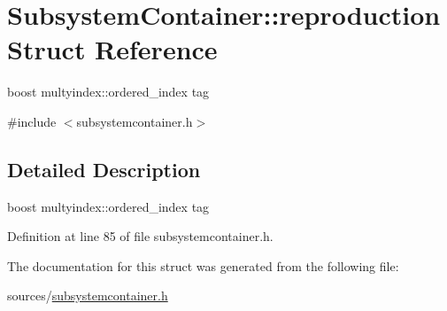 \hypertarget{structSubsystemContainer_1_1reproduction}{
\section{SubsystemContainer::reproduction Struct Reference}
\label{structSubsystemContainer_1_1reproduction}
}


boost multyindex::ordered\_\-index tag  




{\ttfamily \#include $<$subsystemcontainer.h$>$}



\subsection{Detailed Description}
boost multyindex::ordered\_\-index tag 

Definition at line 85 of file subsystemcontainer.h.



The documentation for this struct was generated from the following file:\begin{DoxyCompactItemize}
\item 
sources/\hyperlink{subsystemcontainer_8h}{subsystemcontainer.h}\end{DoxyCompactItemize}
